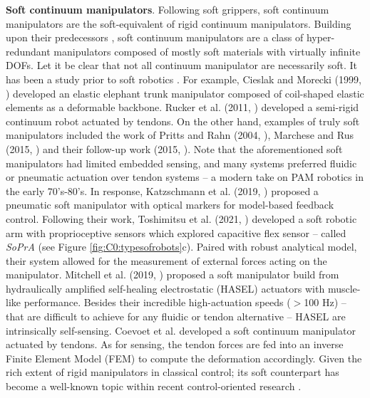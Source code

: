 \par \textbf{Soft continuum manipulators}. Following soft grippers, soft continuum manipulators are the soft-equivalent of rigid continuum manipulators. Building upon their predecessors \cite{Webster2010,Rucker2011Jul,Anderson1967,BurgnerKahrs2015Nov}, soft continuum manipulators are a class of hyper-redundant manipulators composed of mostly soft materials with virtually infinite DOFs. Let it be clear that not all continuum manipulator are necessarily soft. It has been a study prior to soft robotics \cite{Chirikjian1992,Chirikjian1994,Robinson1999}. For example, Cieslak and Morecki (1999, \cite{Cieslak1999}) developed an elastic elephant trunk manipulator composed of coil-shaped elastic elements as a deformable backbone. Rucker et al. (2011, \cite{Rucker2011Jul}) developed a semi-rigid continuum robot actuated by tendons. On the other hand, examples of truly soft manipulators included the work of Pritts and Rahn (2004, \cite{Pritts2004}), Marchese and Rus (2015, \cite{Marchese2015}) and their follow-up work (2015, \cite{Marchese2016}). Note that the aforementioned soft manipulators had limited embedded sensing, and many systems preferred fluidic or pneumatic actuation over tendon systems --  a modern take on PAM robotics in the early 70's-80's. In response, Katzschmann et al. (2019, \cite{Katzschmann2019}) proposed a pneumatic soft manipulator with optical markers for model-based feedback control. Following their work, Toshimitsu et al. (2021, \cite{Toshimitsu2021Sep}) developed a soft robotic arm with proprioceptive sensors which explored capacitive flex sensor -- called \textit{SoPrA} (see Figure \ref{fig:C0:typesofrobots}c). Paired with robust analytical model, their system allowed for the measurement of external forces acting on the manipulator. Mitchell et al. (2019, \cite{Mitchell2019}) proposed a soft manipulator build from hydraulically amplified self-healing electrostatic (HASEL) actuators with muscle-like performance. Besides their incredible high-actuation speeds ($>$100 \si{\hertz}) -- that are difficult to achieve for any fluidic or tendon alternative -- HASEL are intrinsically self-sensing. Coevoet et al. \cite{Coevoet2017Feb} developed a soft continuum manipulator actuated by tendons. As for sensing, the tendon forces are fed into an inverse Finite Element Model (FEM) to compute the deformation accordingly. Given the rich extent of rigid manipulators in classical control; its soft counterpart has become a well-known topic within recent control-oriented research \cite{DellaSantina2021}. 


